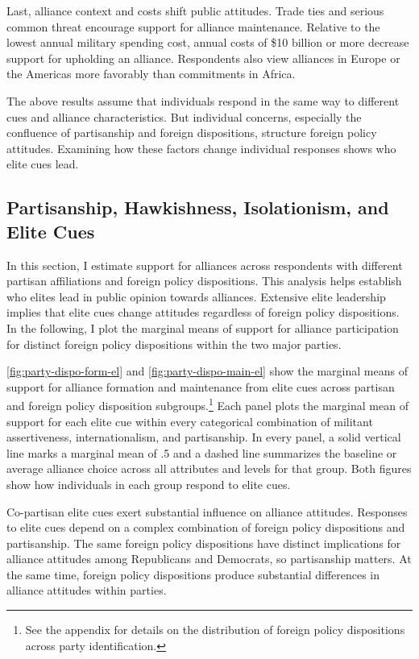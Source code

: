 \documentclass[12pt]{article}
\begin{document}
Last, alliance context and costs shift public attitudes. 
Trade ties and serious common threat encourage support for alliance maintenance. 
Relative to the lowest annual military spending cost, annual costs of \$10 billion or more decrease support for upholding an alliance.  
Respondents also view alliances in Europe or the Americas more favorably than commitments in Africa. 


The above results assume that individuals respond in the same way to different cues and alliance characteristics. 
But individual concerns, especially the confluence of partisanship and foreign dispositions, structure foreign policy attitudes.
Examining how these factors change individual responses shows who elite cues lead.  



\subsection{Partisanship, Hawkishness, Isolationism, and Elite Cues}



In this section, I estimate support for alliances across respondents with different partisan affiliations and foreign policy dispositions.  
This analysis helps establish who elites lead in public opinion towards alliances. 
Extensive elite leadership implies that elite cues change attitudes regardless of foreign policy dispositions. 
In the following, I plot the marginal means of support for alliance participation for distinct foreign policy dispositions within the two major parties.  


\autoref{fig:party-dispo-form-el} and \autoref{fig:party-dispo-main-el} show the marginal means of support for alliance formation and maintenance from elite cues across partisan and foreign policy disposition subgroups.\footnote{See the appendix for details on the distribution of foreign policy dispositions across party identification.} 
Each panel plots the marginal mean of support for each elite cue within every categorical combination of militant assertiveness, internationalism, and partisanship.
In every panel, a solid vertical line marks a marginal mean of .5 and a dashed line summarizes the baseline or average alliance choice across all attributes and levels for that group.  
Both figures show how individuals in each group respond to elite cues. 


Co-partisan elite cues exert substantial influence on alliance attitudes.
Responses to elite cues depend on a complex combination of foreign policy dispositions and partisanship. 
The same foreign policy dispositions have distinct implications for alliance attitudes among Republicans and Democrats, so partisanship matters.
At the same time, foreign policy dispositions produce substantial differences in alliance attitudes within parties.  
\end{document}
